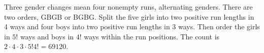 Three gender changes mean four nonempty runs, alternating genders. There are two orders, GBGB or BGBG. Split the five girls into two positive run lengths in 4 ways and four boys into two positive run lengths in 3 ways. Then order the girls in $ 5!$ ways and boys in $ 4!$ ways within the run positions. The count is $\boxed{2\cdot4\cdot3\cdot5!4!=69120}$.

